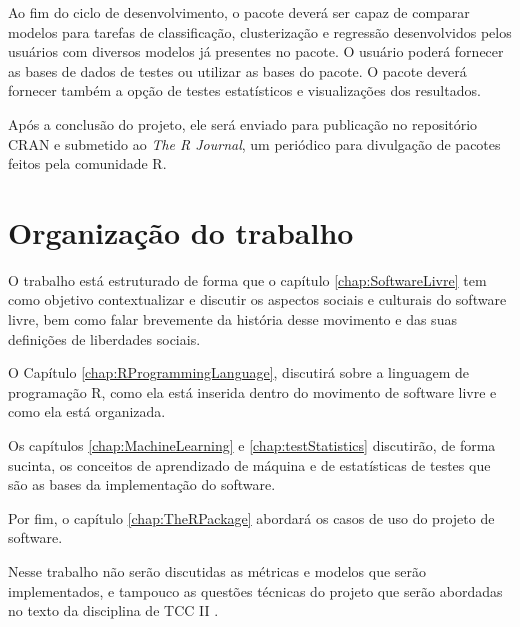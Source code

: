 Ao fim do ciclo de desenvolvimento, o pacote deverá ser capaz de comparar modelos para tarefas de classificação, clusterização e regressão desenvolvidos pelos usuários com diversos modelos já presentes no pacote.  O usuário poderá fornecer as bases de dados de testes ou utilizar as bases do pacote. O pacote deverá fornecer também a opção de testes estatísticos e visualizações dos resultados.

Após a conclusão do projeto, ele será enviado para publicação no repositório CRAN e submetido ao \textit{The R Journal}, um periódico para divulgação de pacotes feitos pela comunidade R.


\section{Organização do trabalho}
\label{sec:organizacaoTrabalho}

O trabalho está estruturado de forma que o capítulo \ref{chap:SoftwareLivre} tem como objetivo contextualizar e discutir os aspectos sociais e culturais do software livre, bem como falar brevemente da história desse movimento e das suas definições de liberdades sociais.

O Capítulo \ref{chap:RProgrammingLanguage}, discutirá sobre a linguagem de programação R, como ela está inserida dentro do movimento de software livre e como ela está organizada. 

Os capítulos \ref{chap:MachineLearning} e \ref{chap:testStatistics} discutirão, de forma sucinta, os conceitos de aprendizado de máquina e de estatísticas de testes que são as bases da implementação do software. 

Por fim, o capítulo \ref{chap:TheRPackage} abordará os casos de uso do projeto de software.

Nesse trabalho não serão discutidas as métricas e modelos que serão implementados, e tampouco as questões técnicas do projeto que serão abordadas no texto da disciplina de TCC II .
